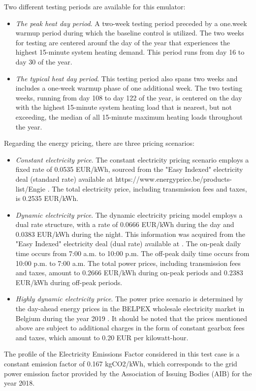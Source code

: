 Two different testing periods are available for this emulator:
\begin{itemize}
    \item \emph{The peak heat day period}. A two-week testing period preceded by a one.week warmup period during which the baseline control is utilized. The two weeks for testing are centered arounf the day of the year that experiences the highest 15-minute system heating demand. This period runs from day 16 to day 30 of the year.
    \item \emph{The typical heat day period}. This testing period also spans two weeks and includes a one-week warmup phase of one additional week. The two testing weeks, running from day 108 to day 122 of the year, is centered on the day with the highest 15-minute system heating load that is nearest, but not exceeding, the median of all 15-minute maximum heating loads throughout the year.
\end{itemize}
Regarding the energy pricing, there are three pricing scenarios: 
\begin{itemize}
    \item \emph{Constant electricity price}. The constant electricity pricing scenario employs a fixed rate of 0.0535 EUR/kWh, sourced from the "Easy Indexed" electricity deal (standard rate) available at https://www.energyprice.be/products-list/Engie \cite{Engie}.  The total electricity price, including transmission fees and taxes, is 0.2535 EUR/kWh.
    \item \emph{Dynamic electricity price}. The dynamic electricity pricing model employs a dual rate structure, with a rate of 0.0666 EUR/kWh during the day and 0.0383 EUR/kWh during the night. This information was acquired from the "Easy Indexed" electricity deal (dual rate) available at \cite{Engie}.   The on-peak daily time occurs from 7:00 a.m. to 10:00 p.m.   The off-peak daily time occurs from 10:00 p.m. to 7:00 a.m.  The total power prices, including transmission fees and taxes, amount to 0.2666 EUR/kWh during on-peak periods and 0.2383 EUR/kWh during off-peak periods.
    \item \emph{Highly dynamic electricity price}. The power price scenario is determined by the day-ahead energy prices in the BELPEX wholesale electricity market in Belgium during the year 2019 \cite{Elexys}.  It should be noted that the prices mentioned above are subject to additional charges in the form of constant gearbox fees and taxes, which amount to 0.20 EUR per kilowatt-hour.
\end{itemize} 
The profile of the Electricity Emissions Factor considered in this test case is a constant emission factor of 0.167 kgCO2/kWh, which corresponds to the grid power emission factor provided by the Association of Issuing Bodies (AIB) for the year 2018. 

